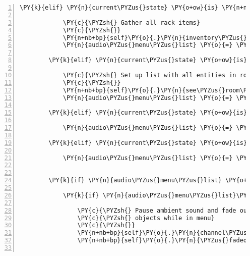 \begin{Verbatim}[commandchars=\\\{\},numbers=left,firstnumber=1,stepnumber=1]
        \PY{k}{elif} \PY{n}{current\PYZus{}state} \PY{o+ow}{is} \PY{n+nb+bp}{self}\PY{o}{.}\PY{n}{INPUT\PYZus{}STATE\PYZus{}SEE\PYZus{}RACK}\PY{p}{:}

            \PY{c}{\PYZsh{} Gather all rack items}
            \PY{c}{\PYZsh{}}
            \PY{n+nb+bp}{self}\PY{o}{.}\PY{n}{inventory\PYZus{}menu}\PY{o}{.}\PY{n}{list} \PY{o}{=} \PY{n+nb+bp}{self}\PY{o}{.}\PY{n}{\PYZus{}get\PYZus{}rack\PYZus{}items}\PY{p}{(}\PY{p}{)}
            \PY{n}{audio\PYZus{}menu\PYZus{}list} \PY{o}{=} \PY{n+nb+bp}{self}\PY{o}{.}\PY{n}{inventory\PYZus{}menu}

        \PY{k}{elif} \PY{n}{current\PYZus{}state} \PY{o+ow}{is} \PY{n+nb+bp}{self}\PY{o}{.}\PY{n}{INPUT\PYZus{}STATE\PYZus{}SEE\PYZus{}ROOM}\PY{p}{:}

            \PY{c}{\PYZsh{} Set up list with all entities in room}
            \PY{c}{\PYZsh{}}
            \PY{n+nb+bp}{self}\PY{o}{.}\PY{n}{see\PYZus{}room\PYZus{}menu}\PY{o}{.}\PY{n}{list} \PY{o}{=} \PY{n+nb+bp}{self}\PY{o}{.}\PY{n}{\PYZus{}get\PYZus{}room\PYZus{}entities}\PY{p}{(}\PY{p}{)}
            \PY{n}{audio\PYZus{}menu\PYZus{}list} \PY{o}{=} \PY{n+nb+bp}{self}\PY{o}{.}\PY{n}{see\PYZus{}room\PYZus{}menu}

        \PY{k}{elif} \PY{n}{current\PYZus{}state} \PY{o+ow}{is} \PY{n+nb+bp}{self}\PY{o}{.}\PY{n}{INPUT\PYZus{}STATE\PYZus{}HELP\PYZus{}MENU}\PY{p}{:}

            \PY{n}{audio\PYZus{}menu\PYZus{}list} \PY{o}{=} \PY{n+nb+bp}{self}\PY{o}{.}\PY{n}{help\PYZus{}menu}

        \PY{k}{elif} \PY{n}{current\PYZus{}state} \PY{o+ow}{is} \PY{n+nb+bp}{self}\PY{o}{.}\PY{n}{INPUT\PYZus{}STATE\PYZus{}CONNECTION\PYZus{}DETAILS}\PY{p}{:}

            \PY{n}{audio\PYZus{}menu\PYZus{}list} \PY{o}{=} \PY{n+nb+bp}{self}\PY{o}{.}\PY{n}{connection\PYZus{}details\PYZus{}menu}


        \PY{k}{if} \PY{n}{audio\PYZus{}menu\PYZus{}list} \PY{o+ow}{is} \PY{o+ow}{not} \PY{n+nb+bp}{None}\PY{p}{:}

            \PY{k}{if} \PY{n}{audio\PYZus{}menu\PYZus{}list}\PY{o}{.}\PY{n}{try\PYZus{}to\PYZus{}open\PYZus{}menu\PYZus{}list}\PY{p}{(}\PY{p}{)}\PY{p}{:}

                \PY{c}{\PYZsh{} Pause ambient sound and fade out sounds of surrounding}
                \PY{c}{\PYZsh{} objects while in menu}
                \PY{c}{\PYZsh{}}
                \PY{n+nb+bp}{self}\PY{o}{.}\PY{n}{channel\PYZus{}ambience}\PY{o}{.}\PY{n}{pause}\PY{p}{(}\PY{p}{)}
                \PY{n+nb+bp}{self}\PY{o}{.}\PY{n}{\PYZus{}fadeout\PYZus{}sound\PYZus{}surrounding\PYZus{}entities}\PY{p}{(}\PY{p}{)}


\end{Verbatim}
